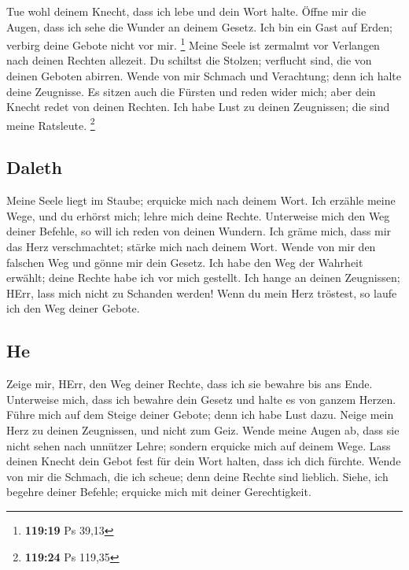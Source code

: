  Tue wohl deinem Knecht, dass ich lebe und dein Wort
halte.  Öffne mir die Augen, dass ich sehe die Wunder an
deinem Gesetz.  Ich bin ein Gast auf Erden; verbirg deine
Gebote nicht vor mir. \footnote{\textbf{119:19} Ps 39,13}
 Meine Seele ist zermalmt vor Verlangen nach deinen
Rechten allezeit.  Du schiltst die Stolzen; verflucht
sind, die von deinen Geboten abirren.  Wende von mir
Schmach und Verachtung; denn ich halte deine Zeugnisse. 
Es sitzen auch die Fürsten und reden wider mich; aber dein Knecht redet
von deinen Rechten.  Ich habe Lust zu deinen Zeugnissen;
die sind meine Ratsleute. \footnote{\textbf{119:24} Ps 119,35}

\hypertarget{daleth}{%
\subsection{Daleth}\label{daleth}}

 Meine Seele liegt im Staube; erquicke mich nach deinem
Wort.  Ich erzähle meine Wege, und du erhörst mich; lehre
mich deine Rechte.  Unterweise mich den Weg deiner
Befehle, so will ich reden von deinen Wundern.  Ich gräme
mich, dass mir das Herz verschmachtet; stärke mich nach deinem Wort.
 Wende von mir den falschen Weg und gönne mir dein
Gesetz.  Ich habe den Weg der Wahrheit erwählt; deine
Rechte habe ich vor mich gestellt.  Ich hange an deinen
Zeugnissen; HErr, lass mich nicht zu Schanden werden! 
Wenn du mein Herz tröstest, so laufe ich den Weg deiner Gebote.

\hypertarget{he}{%
\subsection{He}\label{he}}

 Zeige mir, HErr, den Weg deiner Rechte, dass ich sie
bewahre bis ans Ende.  Unterweise mich, dass ich bewahre
dein Gesetz und halte es von ganzem Herzen.  Führe mich
auf dem Steige deiner Gebote; denn ich habe Lust dazu. 
Neige mein Herz zu deinen Zeugnissen, und nicht zum Geiz.
 Wende meine Augen ab, dass sie nicht sehen nach unnützer
Lehre; sondern erquicke mich auf deinem Wege.  Lass
deinen Knecht dein Gebot fest für dein Wort halten, dass ich dich
fürchte.  Wende von mir die Schmach, die ich scheue; denn
deine Rechte sind lieblich.  Siehe, ich begehre deiner
Befehle; erquicke mich mit deiner Gerechtigkeit.


